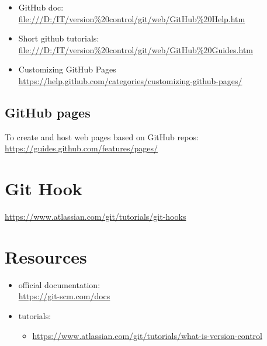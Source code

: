 \documentclass{report}
\begin{document}
\begin{itemize}
\item GitHub doc:\\
\url{file:///D:/IT/version%20control/git/web/GitHub%20Help.htm}

\item Short github tutorials:\\
\url{file:///D:/IT/version%20control/git/web/GitHub%20Guides.htm}

\item Customizing GitHub Pages\\
\url{https://help.github.com/categories/customizing-github-pages/}
\end{itemize}


\chapter{GitHub pages}
To create and host web pages based on GitHub repos:\\
\url{https://guides.github.com/features/pages/}




\part{Git Hook}
\url{https://www.atlassian.com/git/tutorials/git-hooks}



\part{Resources}
\begin{itemize}
	\item official documentation:\\
	\url{https://git-scm.com/docs}
	\item tutorials:
	\begin{itemize}
		\item \url{https://www.atlassian.com/git/tutorials/what-is-version-control}
	\end{itemize}
\end{itemize}
\end{document}
